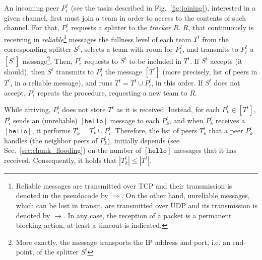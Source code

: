 
\label{sec:peer_joining}
\begin{figure*}
   \caption{Tasks involved in a peer
    joining. $P^t_i$ is the incoming peer, and $P^t_k$ is a peer that
    is already in the team. $R$ represents the tracker, and $S^t$ the
    splitter of the team $T^t$ to which $P^t_k$ belongs, and $P^t_i$
    will be added.\label{fig:joining}}
\end{figure*}
An incoming peer $P^?_i$ (see the tasks described in
Fig.~\ref{fig:joining}), interested in a given channel, first must
join a team in order to access to the contents of such channel. For
that, $P^?_i$ requests a splitter to the \emph{tracker} $R$. $R$, that
continuously is receiving in \emph{reliable}\footnote{Reliable
  messages are transmitted over TCP and their transmission is denoted
  in the pseudocode by $\Rightarrow$. On the other hand, unreliable
  messages, which can be lost in transit, are transmitted over UDP and
  its transmission is denoted by $\rightarrow$. In any case, the
  reception of a packet is a permanent blocking action, at least a
  timeout is indicated.}  messages the fullness level of each team
$T^t$ from the corresponding splitter $S^t$, selects a team with room
for $P^?_i$, and transmits to $P^?_i$ a $[S^t]$ message\footnote{More
  exactly, the message transports the IP address and port, i.e. an
  end-point, of the splitter $S^t$}. Then, $P^?_i$ requests to $S^t$
to be included in $T^t$. If $S^t$ accepts (it should), then $S^t$
transmits to $P^t_i$ the message $[T^t]$ (more precisely, list of
peers in $T^t$, in a reliable message), and runs $T^t = T^t \cup
P^t_i$, in this order. If $S^t$ does not accept, $P^?_i$ repeats the
procedure, requesting a new team to $R$.


While arriving, $P^t_i$ does not store $T^t$ as it is
received. Instead, for each $P^t_k\in [T^t]$, $P^t_i$ sends an
(unreliable) $[\mathtt{hello}]$ message to each $P^t_k$, and when
$P^t_k$ receives a $[\mathtt{hello}]$, it performs $T^t_k = T^t_k \cup
P^t_i$. Therefore, the list of peers $T^t_k$ that a peer $P^t_k$
handles (the neighbor peers of $P^t_k$), initially depends (see
Sec.~\ref{sec:chunk_flooding}) on the number of $[\mathtt{hello}]$
messages that it has received. Consequently, it holds that
$|T^t_k| \le |T^t|$.

